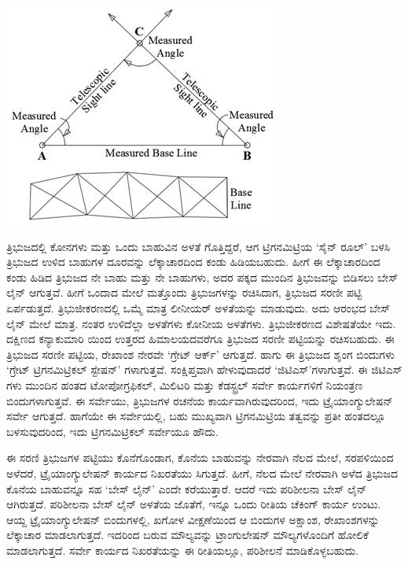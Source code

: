 \begin{center}
\includegraphics[scale=0.55]{"images/image003.jpg"}
\end{center}

ತ್ರಿಭುಜದಲ್ಲಿ  ಕೋನಗಳು ಮತ್ತು ಒಂದು ಬಾಹುವಿನ ಅಳತೆ ಗೊತ್ತಿದ್ದರೆ, ಆಗ ಟ್ರಿಗನಮಿಟ್ರಿಯ ‘ಸೈನ್​ ರೂಲ್​’ ಬಳಸಿ ತ್ರಿಭುಜದ ಉಳಿದ  ಬಾಹುಗಳ ದೂರವನ್ನು ಲೆಕ್ಕಾಚಾರದಿಂದ ಕಂಡು ಹಿಡಿಯಬಹುದು. ಹೀಗೆ ಈ ಲೆಕ್ಕಾಚಾರದಿಂದ ಕಂಡು ಹಿಡಿದ ತ್ರಿಭುಜದ ನೇ ಬಾಹು ಮತ್ತು ನೇ ಬಾಹುಗಳು, ಅದರ ಪಕ್ಕದ ಮುಂದಿನ ತ್ರಿಭುಜವನ್ನು ಬಿಡಿಸಲು ಬೇಸ್​ ಲೈನ್​ ಆಗುತ್ತವೆ. ಹೀಗೆ ಒಂದಾದ ಮೇಲೆ ಮತ್ತೊಂದು ತ್ರಿಭುಜಗಳನ್ನು ರಚಿಸಿದಾಗ, ತ್ರಿಭುಜದ ಸರಣೀ ಪಟ್ಟಿ ಏರ್ಪಡುತ್ತದೆ. ತ್ರಿಭುಜೀಕರಣದಲ್ಲಿ ಒಮ್ಮೆ ಮಾತ್ರ ಲೀನೀಯರ್​ ಅಳತೆಯನ್ನು ಮಾಡುವುದು. ಅದು ಆರಂಭದ ಬೇಸ್​ ಲೈನ್​ ಮೇಲೆ ಮಾತ್ರ. ನಂತರ ಉಳಿದೆಲ್ಲಾ ಅಳತೆಗಳು ಕೋನೀಯ ಅಳತೆಗಳು. ತ್ರಿಭುಜೀಕರಣದ ವಿಶೇಷತೆಯೇ ಇದು. ದಕ್ಷಿಣದ ಕನ್ಯಾಕುಮಾರಿ ಯಿಂದ ಉತ್ತರದ ಹಿಮಾಲಯದವರೆಗೂ ತ್ರಿಭುಜದ ಸರಣೀ ಪಟ್ಟಿಯನ್ನು ರಚಿಸಬಹುದು. ಈ ತ್ರಿಭುಜದ ಸರಣೀ ಪಟ್ಟಿಯ, ರೇಖಾಂಶ ನೇರವೇ ‘ಗ್ರೇಟ್​ ಆರ್ಕ್’ ಆಗುತ್ತದೆ. ಹಾಗು ಈ ತ್ರಿಭುಜದ ಶೃಂಗ ಬಿಂದುಗಳು ‘ಗ್ರೇಟ್​ ಟ್ರಿಗನಮಿಟ್ರಿಕಲ್​ ಸ್ಟೇಷನ್​’ ಗಳಾಗುತ್ತವೆ. ಸಂಕ್ಷಿಪ್ತವಾಗಿ ಹೇಳುವುದಾದರೆ ‘ಜಿಟಿಎಸ್​’ಗಳಾಗುತ್ತವೆ. ಈ ಜಿಟಿಎಸ್​ಗಳು ಮುಂದಿನ ಹಂತದ ಟೋಪೋಗ್ರಫಿಕಲ್​, ಮಿಲಿಟರಿ ಮತ್ತು ಕೆಡಸ್ಟ್ರಲ್​ ಸರ್ವೇ ಕಾರ್ಯಗಳಿಗೆ ನಿಯಂತ್ರಣ ಬಿಂದುಗಳಾಗುತ್ತವೆ. ಈ ಸರ್ವೇಯು, ತ್ರಿಭುಜಗಳ ರಚನೆಯ ಕಾರ್ಯವಾಗಿರುವುದರಿಂದ, ಇದು ಟ್ರೈಯಾಂಗ್ಯುಲೇಷನ್​ ಸರ್ವೇ ಆಗುತ್ತದೆ. ಹಾಗೆಯೇ ಈ ಸರ್ವೇಯಲ್ಲಿ, ಬಹು ಮುಖ್ಯವಾಗಿ ಟ್ರಿಗನಮಿಟ್ರಿಯ ತತ್ವವನ್ನು ಪ್ರತೀ ಹಂತದಲ್ಲೂ ಬಳಸುವುದರಿಂದ, ಇದು ಟ್ರಿಗನಮಿಟ್ರಿಕಲ್​ ಸರ್ವೇಯೂ ಹೌದು.

ಈ ಸರಣಿ ತ್ರಿಭುಜಗಳ ಪಟ್ಟಿಯು ಕೊನೆಗೊಂಡಾಗ, ಕೊನೆಯ ಬಾಹುವನ್ನು ನೇರವಾಗಿ ನೆಲದ ಮೇಲೆ, ಸರಪಳಿಯಿಂದ ಅಳೆದರೆ, ಟ್ರೈಯಾಂಗ್ಯುಲೇಷನ್​ ಕಾರ್ಯದ ನಿಖರತೆಯು ಸಿಗುತ್ತದೆ. ಹೀಗೆ, ನೆಲದ ಮೇಲೆ ನೇರವಾಗಿ ಅಳೆದ ತ್ರಿಭುಜದ ಕೊನೆಯ ಬಾಹುವನ್ನೂ ಸಹ ‘ಬೇಸ್​ ಲೈನ್​’ ಎಂದೇ ಕರೆಯುತ್ತಾರೆ. ಆದರೆ ಇದು ಪರಿಶೀಲನಾ ಬೇಸ್​ ಲೈನ್​ ಆಗಿರುತ್ತದೆ. ಪರಿಶೀಲನಾ ಬೇಸ್​ ಲೈನ್​ ಅಳತೆಯ ಜೊತೆಗೆ, ಇನ್ನೂ ಒಂದು ರೀತಿಯ ಚೆಕಿಂಗ್​ ಕಾರ್ಯ ಉಂಟು. ಆಯ್ದ ಟ್ರೈಯಾಂಗ್ಯುಲೇಷನ್​ ಬಿಂದುಗಳಲ್ಲಿ, ಖಗೋಳ ವೀಕ್ಷಣೆಯಿಂದ ಆ ಬಿಂದುಗಳ ಅಕ್ಷಾಂಶ, ರೇಖಾಂಶಗಳನ್ನು ಲೆಕ್ಕಾಚಾರ ಮಾಡಲಾಗುತ್ತದೆ. ಇದರಿಂದ ಬರುವ ಮೌಲ್ಯವನ್ನು ಟ್ರಾಂಗುಲೇಷನ್​ ಮೌಲ್ಯಗಳೊಂದಿಗೆ ಹೋಲಿಕೆ ಮಾಡಲಾಗುತ್ತದೆ. ಸರ್ವೇ ಕಾರ್ಯದ ನಿಖರತೆಯನ್ನು ಈ ರೀತಿಯಲ್ಲೂ, ಪರಿಶೀಲನೆ ಮಾಡಿಕೊಳ್ಳಬಹುದು.


